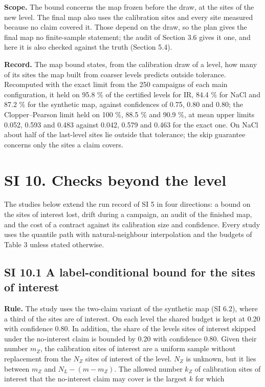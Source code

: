 \documentclass{iopjournal}
\begin{document}
\textbf{Scope.} The bound concerns the map frozen before the draw, at the sites of the new level. The final map also uses the calibration sites and every site measured because no claim covered it. Those depend on the draw, so the plan gives the final map no finite-sample statement; the audit of Section 3.6 gives it one, and here it is also checked against the truth (Section 5.4).

\textbf{Record.} The map bound states, from the calibration draw of a level, how many of its sites the map built from coarser levels predicts outside tolerance. Recomputed with the exact limit from the 250 campaigns of each main configuration, it held on 95.8 \% of the certified levels for IR, 84.4 \% for NaCl and 87.2 \% for the synthetic map, against confidences of 0.75, 0.80 and 0.80; the Clopper--Pearson limit held on 100 \%, 88.5 \% and 90.9 \%, at mean upper limits 0.052, 0.593 and 0.483 against 0.042, 0.579 and 0.463 for the exact one. On NaCl about half of the last-level sites lie outside that tolerance; the skip guarantee concerns only the sites a claim covers.

\hypertarget{si-10.-checks-beyond-the-level}{%
\section*{SI 10. Checks beyond the level}\label{si-10.-checks-beyond-the-level}}

The studies below extend the run record of SI 5 in four directions: a bound on the sites of interest lost, drift during a campaign, an audit of the finished map, and the cost of a contract against its calibration size and confidence. Every study uses the quantile path with natural-neighbour interpolation and the budgets of Table 3 unless stated otherwise.

\hypertarget{si-10.1-a-label-conditional-bound-for-the-sites-of-interest}{%
\subsection*{SI 10.1 A label-conditional bound for the sites of interest}\label{si-10.1-a-label-conditional-bound-for-the-sites-of-interest}}

\textbf{Rule.} The study uses the two-claim variant of the synthetic map (SI 6.2), where a third of the sites are of interest. On each level the shared budget is kept at 0.20 with confidence 0.80. In addition, the share of the level\textquotesingle s sites of interest skipped under the no-interest claim is bounded by 0.20 with confidence 0.80. Given their number \(m_Z\), the calibration sites of interest are a uniform sample without replacement from the \(N_Z\) sites of interest of the level. \(N_Z\) is unknown, but it lies between \(m_Z\) and \(N_L - (m - m_Z)\). The allowed number \(k_Z\) of calibration sites of interest that the no-interest claim may cover is the largest \(k\) for which
\end{document}
